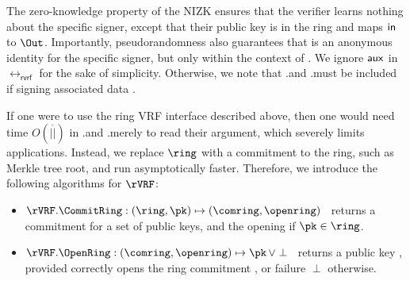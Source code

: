 

The zero-knowledge property of the NIZK ensures that the verifier learns nothing about the specific
signer, except that their public key is in the ring and maps $\mathsf{in}$ to $\Out$.
Importantly, pseudorandomness also guarantees that \Out is an anonymous identity
for the specific signer, but only within the context of \msg.  We ignore $ \mathsf{aux} $ in $ \rel_{\mathsf{rvrf}} $ for the sake of simplicity. Otherwise, we note that  \rVRF.\Sign and \rVRF.\Verify must be included if signing associated data \aux. 





If one were to use the ring VRF interface described above, then one would need time
$O(|\ring|)$ in \rVRF.\rSign and \rVRF.\rVerify merely to read their \ring
argument, which severely limits applications.
Instead, we replace $ \ring $ with a commitment to the ring, such as Merkle tree root, and run asymptotically faster. Therefore, we introduce the following algorithms for $ \rVRF $:
\begin{itemize}
\item $\rVRF.\CommitRing : (\ring,\pk) \mapsto (\comring,\openring)$ \,
    returns a commitment for a set \ring of public keys, and
     the opening \openring if $\pk \in \ring$.
\item $\rVRF.\OpenRing : (\comring,\openring) \mapsto \pk \, \lor \perp$ \,
    returns a public key \pk, provided \openring correctly opens
    the ring commitment \comring, or failure $\perp$ otherwise.
\end{itemize}

